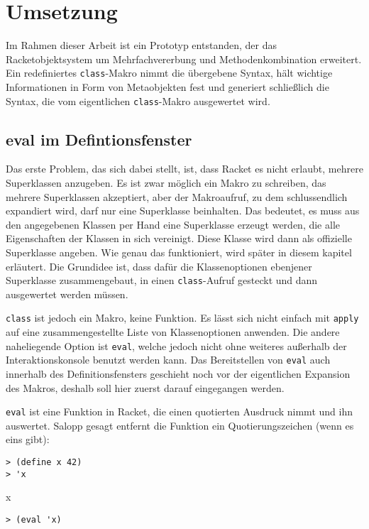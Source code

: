 \chapter{Umsetzung}  
\label{implementation}

\vspace{-1em}
Im Rahmen dieser Arbeit ist ein Prototyp entstanden, der das Racketobjektsystem um Mehrfachvererbung und Methodenkombination erweitert. Ein redefiniertes \texttt{class}-Makro nimmt die übergebene Syntax, hält wichtige Informationen in Form von Metaobjekten fest und generiert schließlich die Syntax, die vom eigentlichen \texttt{class}-Makro ausgewertet wird.

\section{eval im Defintionsfenster}

Das erste Problem, das sich dabei stellt, ist, dass Racket es nicht erlaubt, mehrere Superklassen anzugeben. Es ist zwar möglich ein Makro zu schreiben, das mehrere Superklassen akzeptiert, aber der Makroaufruf, zu dem schlussendlich expandiert wird, darf nur eine Superklasse beinhalten. Das bedeutet, es muss aus den angegebenen Klassen per Hand eine Superklasse erzeugt werden, die alle Eigenschaften der Klassen in sich vereinigt. Diese Klasse wird dann als offizielle Superklasse angeben. Wie genau das funktioniert, wird später in diesem kapitel erläutert. Die Grundidee ist, dass dafür die Klassenoptionen ebenjener Superklasse zusammengebaut, in einen \texttt{class}-Aufruf gesteckt und dann ausgewertet werden müssen.

\texttt{class} ist jedoch ein Makro, keine Funktion. Es lässt sich nicht einfach mit \texttt{apply} auf eine zusammengestellte Liste von Klassenoptionen anwenden. Die andere naheliegende Option ist \texttt{eval}, welche jedoch nicht ohne weiteres außerhalb der Interaktionskonsole benutzt werden kann. Das Bereitstellen von \texttt{eval} auch innerhalb des Definitionsfensters geschieht noch vor der eigentlichen Expansion des Makros, deshalb soll hier zuerst darauf eingegangen werden.

\texttt{eval} ist eine Funktion in Racket, die einen quotierten Ausdruck nimmt und ihn auswertet. Salopp gesagt entfernt die Funktion ein Quotierungszeichen (wenn es eins gibt):

\begin{lstlisting}
> (define x 42)
> 'x
\end{lstlisting}
{\rsymbol x}
\vspace{-1em}
\begin{lstlisting}
> (eval 'x)
\end{lstlisting}
{}

